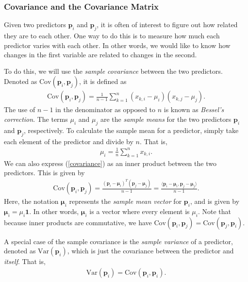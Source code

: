 \documentclass[10pt]{article}
\newcommand{\mydef}[1]{\textcolor{SteelBlue3}{\textit{#1}}} %
\begin{document}
\subsubsection{Covariance and the Covariance Matrix}

Given two predictors $\mathbf{p}_i$ and $\mathbf{p}_j$, it is often of interest to figure out how related they are to each other. One way to do this is to measure how much each predictor varies with each other. In other words, we would like to know how changes in the first variable are related to changes in the second. 

To do this, we will use the \mydef{sample covariance} between the two predictors. Denoted as $\mathrm{Cov}(\mathbf{p}_i, \mathbf{p}_j)$, it is defined as 
\begin{align}
    \label{covariance}
    \mathrm{Cov}(\mathbf{p}_i, \mathbf{p}_j) = \frac{1}{n-1} \sum_{k=1}^n (x_{k,i} - \mu_i)(x_{k,j}-\mu_j).
\end{align}
The use of $n-1$ in the denominator as opposed to $n$ is known as \mydef{Bessel's correction}. The terms $\mu_i$ and $\mu_j$ are the \mydef{sample means} for the two predictors $\mathbf{p}_i$ and $\mathbf{p}_j$, respectively. To calculate the sample mean for a predictor, simply take each element of the predictor and divide by $n$. That is,
\begin{align}
    \label{samplemean}
    \mu_i = \frac{1}{n} \sum_{k=1}^n x_{k,i}.
\end{align}
We can also express (\ref{covariance}) as an inner product between the two predictors. This is given by 
\begin{align}
    \label{covarianceasinnerproduct}
    \mathrm{Cov}(\mathbf{p}_i, \mathbf{p}_j) = \frac{(\mathbf{p}_i - \bm{\mu}_i)^T(\mathbf{p}_j - \bm{\mu}_j)}{n-1} = \frac{\langle \mathbf{p}_i - \bm{\mu}_i, \mathbf{p}_j - \bm{\mu}_j \rangle}{n-1}.
\end{align}
Here, the notation $\bm{\mu}_i$ represents the \mydef{sample mean vector} for $\mathbf{p}_i$, and is given by $\bm{\mu}_i = \mu_i \mathbf{1}$. In other words, $\bm{\mu}_i$ is a vector where every element is $\mu_i$. Note that because inner products are commutative, we have $\mathrm{Cov}(\mathbf{p}_i, \mathbf{p}_j) = \mathrm{Cov}(\mathbf{p}_j, \mathbf{p}_i)$.

A special case of the sample covariance is the \mydef{sample variance} of a predictor, denoted as $\mathrm{Var}(\mathbf{p}_i)$, which is just the covariance between the predictor and \textit{itself}. That is, 
\begin{align}
    \label{variance}
    \mathrm{Var}(\mathbf{p}_i) = \mathrm{Cov}(\mathbf{p}_i, \mathbf{p}_i).
\end{align}
\end{document}
